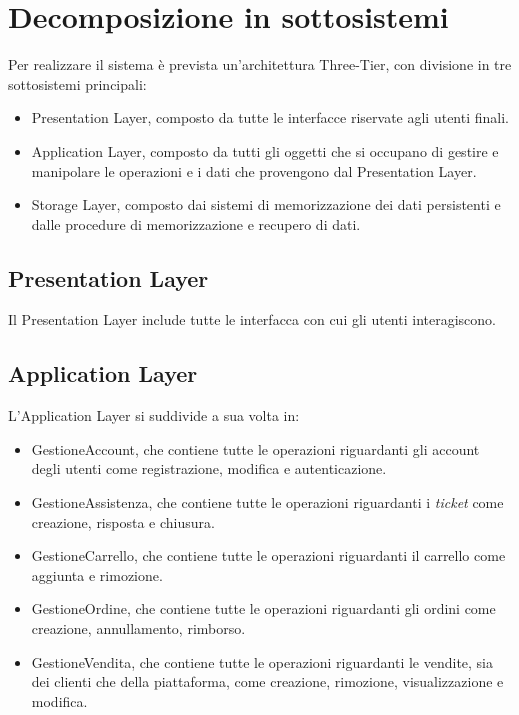 \documentclass[12pt,a4paper]{article}
\begin{document}

\section{Decomposizione in sottosistemi}
Per realizzare il sistema è prevista un'architettura Three-Tier, con divisione in tre sottosistemi principali:
\begin{itemize}
\item Presentation Layer, composto da tutte le interfacce riservate agli utenti finali.
\item Application Layer, composto da tutti gli oggetti che si occupano di gestire e manipolare le operazioni e i dati che provengono dal Presentation Layer.
\item Storage Layer, composto dai sistemi di memorizzazione dei dati persistenti e dalle procedure di memorizzazione e recupero di dati. 
\end{itemize}

\subsection{Presentation Layer}
Il Presentation Layer include tutte le interfacca con cui gli utenti interagiscono.

\subsection{Application Layer}
L'Application Layer si suddivide a sua volta in:

\begin{itemize}
\item GestioneAccount, che contiene tutte le operazioni riguardanti gli account degli utenti come registrazione, modifica e autenticazione.
\item GestioneAssistenza, che contiene tutte le operazioni riguardanti i \emph{ticket} come creazione, risposta e chiusura.
\item GestioneCarrello, che contiene tutte le operazioni riguardanti il carrello come aggiunta e rimozione.
\item GestioneOrdine, che contiene tutte le operazioni riguardanti gli ordini come creazione, annullamento, rimborso.
\item GestioneVendita, che contiene tutte le operazioni riguardanti le vendite, sia dei clienti che della piattaforma, come creazione, rimozione, visualizzazione e modifica.
\end{itemize}
\end{document}
